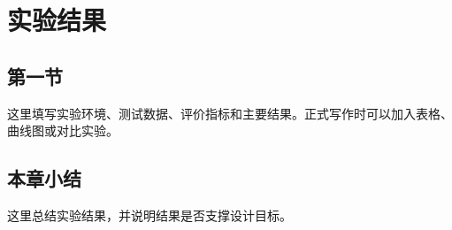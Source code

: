 \chapter{实验结果}

\section{第一节}

这里填写实验环境、测试数据、评价指标和主要结果。正式写作时可以加入表格、曲线图或对比实验。

\section{本章小结}

这里总结实验结果，并说明结果是否支撑设计目标。
